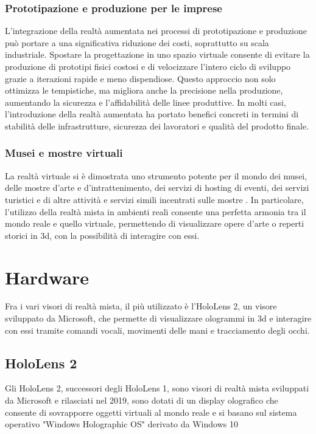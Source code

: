 \subsubsection{Prototipazione e produzione per le imprese}
L'integrazione della realtà aumentata nei processi di prototipazione e produzione può portare a una significativa riduzione dei costi, soprattutto su scala industriale. Spostare la progettazione in uno spazio virtuale consente di evitare la produzione di prototipi fisici costosi e di velocizzare l'intero ciclo di sviluppo grazie a iterazioni rapide e meno dispendiose. Questo approccio non solo ottimizza le tempistiche, ma migliora anche la precisione nella produzione, aumentando la sicurezza e l'affidabilità delle linee produttive. In molti casi, l'introduzione della realtà aumentata ha portato benefici concreti in termini di stabilità delle infrastrutture, sicurezza dei lavoratori e qualità del prodotto finale.\cite{MicrosoftPrototypingforEnterprises}

\subsubsection{Musei e mostre virtuali}
La realtà virtuale si è dimostrata uno strumento potente per il mondo dei musei, delle mostre d'arte e d'intrattenimento, dei servizi di hosting di eventi, dei servizi turistici e di altre attività e servizi simili incentrati sulle mostre \cite{MicrosoftVirtualMuseums}. In particolare, l'utilizzo della realtà mista in ambienti reali consente una perfetta armonia tra il mondo reale e quello virtuale, permettendo di visualizzare opere d'arte o reperti storici in 3d, con la possibilità di interagire con essi. \cite{MixedRealityinMuseums}

\section{Hardware}
Fra i vari visori di realtà mista, il più utilizzato è l'HoloLens 2, un visore sviluppato da Microsoft, che permette di visualizzare ologrammi in 3d e interagire con essi tramite comandi vocali, movimenti delle mani e tracciamento degli occhi. 
\subsection{HoloLens 2}
Gli HoloLens 2, successori degli HoloLens 1, sono visori di realtà mista sviluppati da Microsoft e rilasciati nel 2019, sono dotati di un display olografico che consente di sovrapporre oggetti virtuali al mondo reale e si basano sul sistema operativo "Windows Holographic OS" derivato da Windows 10

